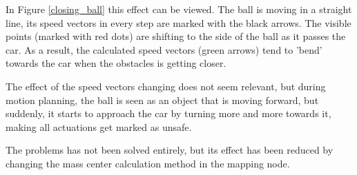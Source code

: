 In Figure \ref{closing_ball} this effect can be viewed. The ball is moving in a straight line, its speed vectors in every step are marked with the black arrows. The visible points (marked with red dots) are shifting to the side of the ball as it passes the car. As a result, the calculated speed vectors (green arrows) tend to 'bend' towards the car when the obstacles is getting closer.

The effect of the speed vectors changing does not seem relevant, but during motion planning, the ball is seen as an object that is moving forward, but suddenly, it starts to approach the car by turning more and more towards it, making all actuations get marked as unsafe.

The problems has not been solved entirely, but its effect has been reduced by changing the mass center calculation method in the mapping node.